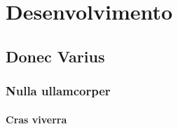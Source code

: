 \chapter{Desenvolvimento}\par
\lipsum[1]
\section{Donec Varius}
\lipsum[1-2]
\subsection{Nulla ullamcorper}
\lipsum[1-2]
\subsubsection{Cras viverra}
\lipsum[1-2]